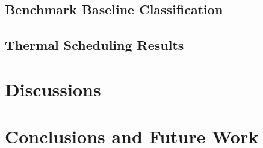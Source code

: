 \documentclass[times,10pt,onecolumn]{article}
\begin{document}
\subsection{Benchmark Baseline Classification}
\label{sec:baseline}

\subsection{Thermal Scheduling Results}
\label{sec:thresults}

\section{Discussions}
\label{sec:discussions}

\section{Conclusions and Future Work}
\label{sec:conclusions}

\label{sec:references}
\small


\end{document}
